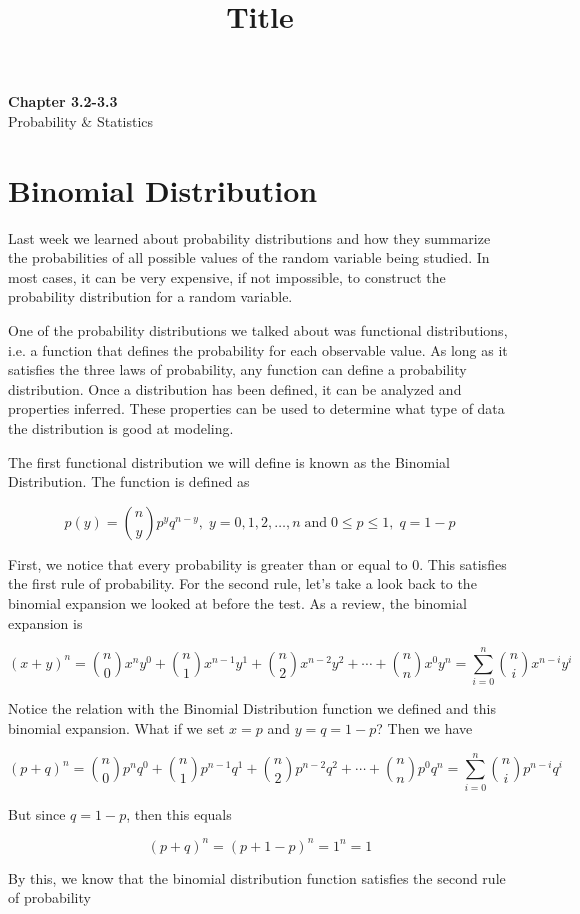 \documentclass[11pt]{article}
\theoremstyle{definition}
\begin{document}
\title{Title}

\thispagestyle{empty}

\begin{center}
{\LARGE \bf Chapter 3.2-3.3}\\
{\large Probability \& Statistics}
\end{center}

\section{Binomial Distribution}

Last week we learned about probability distributions and how they summarize the probabilities of all possible values of the random variable being studied. In most cases, it can be very expensive, if not impossible, to construct the probability distribution for a random variable.

One of the probability distributions we talked about was functional distributions, i.e. a function that defines the probability for each observable value. As long as it satisfies the three laws of probability, any function can define a probability distribution. Once a distribution has been defined, it can be analyzed and properties inferred. These properties can be used to determine what type of data the distribution is good at modeling.

The first functional distribution we will define is known as the Binomial Distribution. The function is defined as

$$
	p(y) = {n \choose y} p^y q^{n-y}, \; y = 0,1,2,\ldots,n \; \text{and} \; 0 \leq p \leq 1, \; q = 1-p
$$

First, we notice that every probability is greater than or equal to 0. This satisfies the first rule of probability. For the second rule, let's take a look back to the binomial expansion we looked at before the test. As a review, the binomial expansion is

$$
	(x + y)^n = {n \choose 0} x^n y^0 + {n \choose 1} x^{n-1}y^1 + {n \choose 2} x^{n-2}y^2 + \cdots + {n \choose n} x^0 y^n = \sum_{i=0}^n {n \choose i} x^{n-i}y^i
$$

Notice the relation with the Binomial Distribution function we defined and this binomial expansion. What if we set $x=p$ and $y=q=1-p$? Then we have

$$
	(p + q)^n = {n \choose 0} p^n q^0 + {n \choose 1} p^{n-1}q^1 + {n \choose 2} p^{n-2}q^2 + \cdots + {n \choose n} p^0 q^n = \sum_{i=0}^n {n \choose i} p^{n-i}q^i
$$

But since $q = 1-p$, then this equals

$$
	(p + q)^n = (p + 1 - p)^n = 1^n = 1
$$

By this, we know that the binomial distribution function satisfies the second rule of probability
\end{document}
